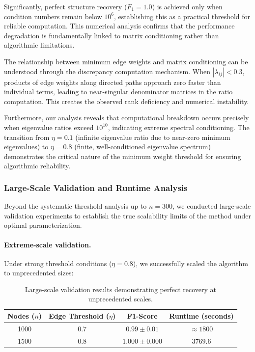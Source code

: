 \documentclass[11pt,a4paper]{article}
\numberwithin{equation}{section}
\begin{document}
Significantly, perfect structure recovery ($F_1 = 1.0$) is achieved only when condition numbers remain below $10^6$, establishing this as a practical threshold for reliable computation. This numerical analysis confirms that the performance degradation is fundamentally linked to matrix conditioning rather than algorithmic limitations.

The relationship between minimum edge weights and matrix conditioning can be understood through the discrepancy computation mechanism. When $|\lambda_{ij}| < 0.3$, products of edge weights along directed paths approach zero faster than individual terms, leading to near-singular denominator matrices in the ratio computation. This creates the observed rank deficiency and numerical instability.

Furthermore, our analysis reveals that computational breakdown occurs precisely when eigenvalue ratios exceed $10^{10}$, indicating extreme spectral conditioning. The transition from $\eta = 0.1$ (infinite eigenvalue ratio due to near-zero minimum eigenvalues) to $\eta = 0.8$ (finite, well-conditioned eigenvalue spectrum) demonstrates the critical nature of the minimum weight threshold for ensuring algorithmic reliability.

\subsubsection{Large-Scale Validation and Runtime Analysis}

Beyond the systematic threshold analysis up to $n = 300$, we conducted large-scale validation experiments to establish the true scalability limits of the method under optimal parameterization.

\paragraph{Extreme-scale validation.} Under strong threshold conditions ($\eta = 0.8$), we successfully scaled the algorithm to unprecedented sizes:

\begin{table}[h]
\centering
\begin{tabular}{cccc}
\toprule
Nodes ($n$) & Edge Threshold ($\eta$) & F1-Score & Runtime (seconds) \\
\midrule
1000 & 0.7 & $0.99 \pm 0.01$ & $\approx 1800$ \\
1500 & 0.8 & $1.000 \pm 0.000$ & $3769.6$ \\
\bottomrule
\end{tabular}
\caption{Large-scale validation results demonstrating perfect recovery at unprecedented scales.}
\label{tab:large_scale}
\end{table}
\end{document}
